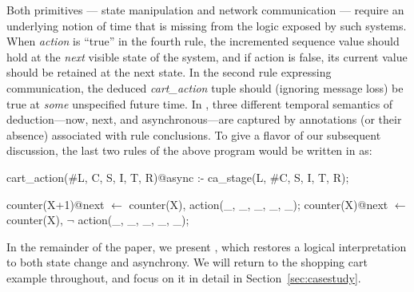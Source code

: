 
Both primitives --- state manipulation and network communication --- require an
underlying notion of time that is missing from the logic exposed by such systems.
When {\em action} is ``true'' in the fourth rule,
the incremented sequence value should
hold at the {\em next} visible state of the system, and if action is false, its current
value should be retained at the next state.  In the second rule expressing communication, 
the deduced {\em cart\_action}
tuple should (ignoring message loss) be true at {\em some} unspecified future time.  In \lang,
three different temporal semantics of deduction---now, next, and asynchronous---are captured by annotations (or their absence) 
associated with rule conclusions.  To give a flavor of our subsequent discussion, the last two rules of the above program would be written in \lang as:

\begin{Dedalus}
cart_action(#L, C, S, I, T, R)@async :-
  ca_stage(L, #C, S, I, T, R);

counter(X+1)@next \(\leftarrow\) counter(X),
                     action(_, _, _, _, _);
counter(X)@next   \(\leftarrow\) counter(X),
                    \(\lnot\) action(_, _, _, _, _);
\end{Dedalus}

In the remainder of the paper, we present \lang, which restores a logical interpretation to
both state change and asynchrony.  We will return to the shopping cart example throughout, and focus on it in detail 
in Section~\ref{sec:casestudy}.

